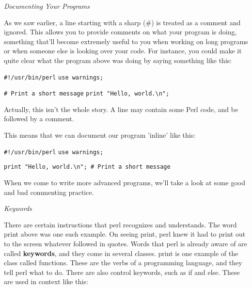 \documentclass[a4paper,11pt]{book}
\begin{document}
\noindent 

\noindent \textit{Documenting Your Programs}

\noindent As we saw earlier, a line starting with a sharp (\#) is treated as a comment and ignored. This allows you to provide comments on what your program is doing, something that'll become extremely useful to you when working on long programs or when someone else is looking over your code. For instance, you could make it quite clear what the program above was doing by saying something like this:

\noindent 

\noindent \texttt{\#!/usr/bin/perl}
\noindent \texttt{use warnings;}

\noindent 

\noindent \texttt{\# Print a short message}
\noindent \texttt{print "Hello, world.\textbackslash n";}

\noindent 

\noindent 

\noindent Actually, this isn't the whole story. A line may contain some Perl code, and be followed by a comment.

\noindent This means that we can document our program 'inline' like this:

\noindent 

\noindent 

\noindent \texttt{\#!/usr/bin/perl}
\noindent \texttt{use warnings;}

\noindent 

\noindent \texttt{print "Hello, world.\textbackslash n"; \# Print a short message}

\noindent 

\noindent When we come to write more advanced programs, we'll take a look at some good and bad commenting practice.

\noindent 

\noindent \textit{Keywords}

\noindent There are certain instructions that perl recognizes and understands. The word print above was one such example. On seeing print, perl knew it had to print out to the screen whatever followed in quotes. Words that perl is already aware of are called \textbf{keywords}, and they come in several classes. print is one example of the class called functions. These are the verbs of a programming language, and they tell perl what to do. There are also control keywords, such as if and else. These are used in context like this:
\end{document}
